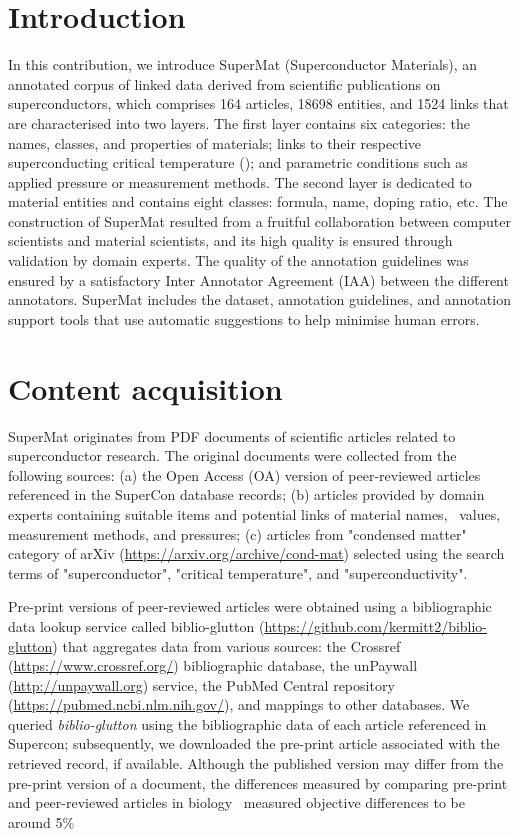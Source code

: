 \section{Introduction}

In this contribution, we introduce SuperMat (Superconductor Materials), an annotated corpus of linked data derived from scientific publications on superconductors, which comprises 164 articles, 18698 entities, and 1524 links that are characterised into two layers. The first layer contains six categories: the names, classes, and properties of materials; links to their respective superconducting critical temperature (\tc); and parametric conditions such as applied pressure or measurement methods.
The second layer is dedicated to material entities and contains eight classes: formula, name, doping ratio, etc. 
The construction of SuperMat resulted from a fruitful collaboration between computer scientists and material scientists, and its high quality is ensured through validation by domain experts. 
The quality of the annotation guidelines was ensured by a satisfactory Inter Annotator Agreement (IAA) between the different annotators. 
SuperMat includes the dataset, annotation guidelines, and annotation support tools that use automatic suggestions to help minimise human errors.

\label{content-acquisition}
\section{Content acquisition}
SuperMat originates from PDF documents of scientific articles related to superconductor research. 
The original documents were collected from the following sources: (a) the Open Access (OA) version of peer-reviewed articles referenced in the SuperCon database records; 
(b) articles provided by domain experts containing suitable items and potential links of material names, \tc~values, measurement methods, and pressures; (c) articles from "condensed matter" category of arXiv (\url{https://arxiv.org/archive/cond-mat}) selected using the search terms of "superconductor", "critical temperature", and "superconductivity". 

Pre-print versions of peer-reviewed articles were obtained using a bibliographic data lookup service called biblio-glutton (\url{https://github.com/kermitt2/biblio-glutton}) that aggregates data from various sources: the Crossref (\url{https://www.crossref.org/}) bibliographic database, the unPaywall (\url{http://unpaywall.org}) service, the PubMed Central repository (\url{https://pubmed.ncbi.nlm.nih.gov/}), and mappings to other databases. 
We queried \textit{biblio-glutton} using the bibliographic data of each article referenced in Supercon; subsequently, we downloaded the pre-print article associated with the retrieved record, if available. 
Although the published version may differ from the pre-print version of a document, the differences measured by comparing pre-print and peer-reviewed articles in biology~\cite{carneiro_comparing_2020} measured objective differences to be around 5\% %


